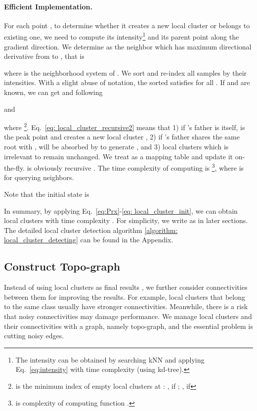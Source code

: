 \documentclass[letterpaper]{article} \usepackage{aaai22}  \usepackage{times}  \usepackage{helvet}  \usepackage{courier}  \usepackage[hyphens]{url}  \usepackage{graphicx} \urlstyle{rm} \def\UrlFont{\rm}  \usepackage{natbib}  \usepackage{caption} \DeclareCaptionStyle{ruled}{labelfont=normalfont,labelsep=colon,strut=off} \frenchspacing  \setlength{\pdfpagewidth}{8.5in}  \setlength{\pdfpageheight}{11in}  \usepackage{subfigure}
\begin{document}
\paragraph{Efficient Implementation.} For each point , to determine whether it creates a new local cluster or belongs to existing one, we need to compute its intensity\footnote{The intensity can be obtained by searching kNN and applying Eq.~\ref{eq:intensity} with time complexity  (using kd-tree).} and its parent point  along the gradient direction. We determine  as the neighbor which has maximum directional derivative from  to , that is

where  is the neighborhood system of . We sort and re-index all samples by their intensities. With a slight abuse of notation, the sorted  satisfies  for all . If  and  are known, we can get  and  following

and

where \footnote{ is the minimum index of empty local clusters at : , if ; , if }. Eq.~\ref{eq: local_cluster_recursive2} means that 1) if 's father is itself,  is the peak point and creates a new local cluster , 2) if 's father shares the same root with ,  will be absorbed by  to generate , and 3) local clusters which is irrelevant to  remain unchanged. We treat  as a mapping table and update it on-the-fly.  is obviously recursive \cite{davis2013computability}. The time complexity of computing  is \footnote{ is complexity of computing function .}, where  is  for querying  neighbors.


Note that the initial state is 





In summary, by applying Eq.~\ref{eq:Prx}-\ref{eq: local_cluster_init}, we can obtain local clusters  with time complexity . For simplicity, we write  as  in later sections. The detailed local cluster detection algorithm \ref{algorithm: local_cluster_detecting} can be found in the Appendix.


\subsection{Construct Topo-graph}
\label{sec:construct_topo_graph}
Instead of using local clusters as final results \cite{comaniciu2002mean, chazal2013persistence, rodriguez2014clustering, jiang2018quickshift++}, we further consider connectivities between them for improving the results. For example, local clusters that belong to the same class usually have stronger connectivities. Meanwhile, there is a risk that noisy connectivities may damage performance. We manage local clusters and their connectivities with a graph, namely topo-graph, and the essential problem is cutting noisy edges.
\end{document}

